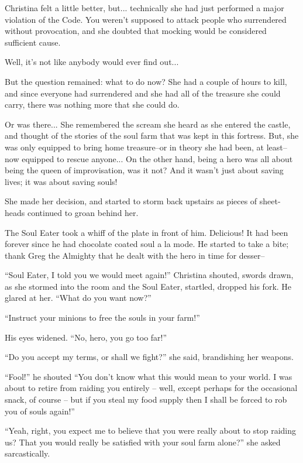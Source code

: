 \documentclass[showtrims,b6paper,draft,10pt]{memoir}
\begin{document}
Christina felt a little better, but... technically she had just performed a major violation of the Code.  You weren't supposed to attack people who surrendered without provocation, and she doubted that mocking would be considered sufficient cause.

Well, it's not like anybody would ever find out...

But the question remained:  what to do now?  She had a couple of hours to kill, and since everyone had surrendered and she had all of the treasure she could carry, there was nothing more that she could do.

Or was there...  She remembered the scream she heard as she entered the castle, and thought of the stories of the soul farm that was kept in this fortress.  But, she was only equipped to bring home treasure--or in theory she had been, at least--now equipped to rescue anyone... On the other hand, being a hero was all about being the queen of improvisation, was it not?  And it wasn't just about saving lives;  it was about saving souls!

She made her decision, and started to storm back upstairs as pieces of sheet-heads continued to groan behind her.

\timeskip
The Soul Eater took a whiff of the plate in front of him.  Delicious!  It had been forever since he had chocolate coated soul a la mode.  He started to take a bite;  thank Greg the Almighty that he dealt with the hero in time for desser--

``Soul Eater, I told you we would meet again!''  Christina shouted, swords drawn, as she stormed into the room and the Soul Eater, startled, dropped his fork.  He glared at her.  ``What do you want now?''

``Instruct your minions to free the souls in your farm!''

His eyes widened.  ``No, hero, you go too far!''

``Do you accept my terms, or shall we fight?'' she said, brandishing her weapons.

``Fool!''  he shouted  ``You don't know what this would mean to your world.  I was about to retire from raiding you entirely -- well, except perhaps for the occasional snack, of course -- but if you steal my food supply then I shall be forced to rob you of souls again!''

``Yeah, right, you expect me to believe that you were really about to stop raiding us?  That you would really be satisfied with your soul farm alone?'' she asked sarcastically.
\end{document}

